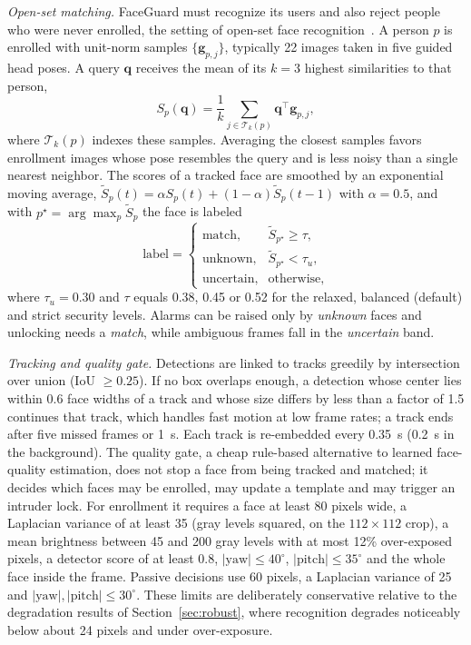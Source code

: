 \documentclass{ieeeaccess}
\begin{document}
\emph{Open-set matching.} FaceGuard must recognize its users and also reject people who were never enrolled, the setting of open-set face recognition~\cite{gunther2017openset}. A person $p$ is enrolled with unit-norm samples $\{\mathbf{g}_{p,j}\}$, typically 22 images taken in five guided head poses. A query $\mathbf{q}$ receives the mean of its $k=3$ highest similarities to that person,
\begin{equation}
S_p(\mathbf{q})=\frac{1}{k}\sum_{j\in\mathcal{T}_k(p)}\mathbf{q}^\top\mathbf{g}_{p,j},
\end{equation}
where $\mathcal{T}_k(p)$ indexes these samples. Averaging the closest samples favors enrollment images whose pose resembles the query and is less noisy than a single nearest neighbor. The scores of a tracked face are smoothed by an exponential moving average, $\tilde{S}_p(t)=\alpha S_p(t)+(1-\alpha)\tilde{S}_p(t-1)$ with $\alpha=0.5$, and with $p^\star=\arg\max_p\tilde{S}_p$ the face is labeled
\begin{equation}
\text{label}=\begin{cases}
\text{match}, & \tilde{S}_{p^\star}\ge\tau,\\
\text{unknown}, & \tilde{S}_{p^\star}<\tau_u,\\
\text{uncertain}, & \text{otherwise,}
\end{cases}
\end{equation}
where $\tau_u=0.30$ and $\tau$ equals 0.38, 0.45 or 0.52 for the relaxed, balanced (default) and strict security levels. Alarms can be raised only by \emph{unknown} faces and unlocking needs a \emph{match}, while ambiguous frames fall in the \emph{uncertain} band.

\emph{Tracking and quality gate.} Detections are linked to tracks greedily by intersection over union (IoU $\ge0.25$). If no box overlaps enough, a detection whose center lies within 0.6 face widths of a track and whose size differs by less than a factor of 1.5 continues that track, which handles fast motion at low frame rates; a track ends after five missed frames or 1~s. Each track is re-embedded every 0.35~s (0.2~s in the background). The quality gate, a cheap rule-based alternative to learned face-quality estimation, does not stop a face from being tracked and matched; it decides which faces may be enrolled, may update a template and may trigger an intruder lock. For enrollment it requires a face at least 80 pixels wide, a Laplacian variance of at least 35 (gray levels squared, on the $112\times112$ crop), a mean brightness between 45 and 200 gray levels with at most 12\% over-exposed pixels, a detector score of at least 0.8, $|\text{yaw}|\le40^\circ$, $|\text{pitch}|\le35^\circ$ and the whole face inside the frame. Passive decisions use 60 pixels, a Laplacian variance of 25 and $|\text{yaw}|,|\text{pitch}|\le30^\circ$. These limits are deliberately conservative relative to the degradation results of Section~\ref{sec:robust}, where recognition degrades noticeably below about 24 pixels and under over-exposure.
\end{document}
